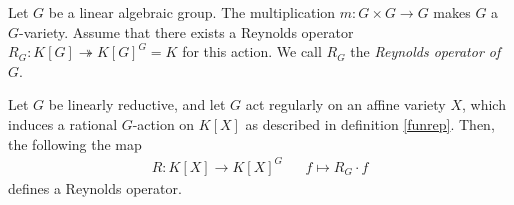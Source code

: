 \begin{definition}
  Let $G$ be a linear algebraic group.
  The multiplication $m \colon G\times G \longrightarrow G$ makes $G$ a $G$-variety.
  Assume that there exists a Reynolds operator $R_G \colon K[G] \twoheadrightarrow K[G]^G = K$ for this action.
  We call $R_G$ the \textit{Reynolds operator of $G$}.
\end{definition}

\begin{theorem}\label{ro}
  Let $G$ be linearly reductive, and let $G$ act regularly on an affine variety $X$, which induces a rational $G$-action on $K[X]$ as described in definition \ref{funrep}.
  Then, the following the map
  \begin{align}
    R \colon K[X] \longrightarrow K[X]^G && f \mapsto R_G \cdot f
  \end{align}
  defines a Reynolds operator.
\end{theorem}

